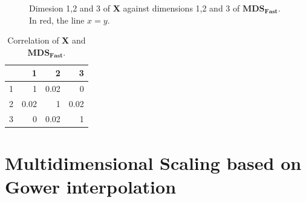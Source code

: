 \documentclass[11pt]{report}
\begin{document}
\begin{figure}[ht]
    \centering
    \caption{Dimesion 1,2 and 3 of \textbf{X} against dimensions 1,2 and 3 of  $\mathbf{MDS_{Fast}}$. \newline
            In red, the line $x=y$.}%
    \label{fast_example}%
\end{figure}


\begin{table}[ht]
\centering
\begin{tabular}{rrrr}
  \hline
 & 1 & 2 & 3 \\ 
  \hline
  1 & 1 & 0.02 & 0 \\ 
  2 & 0.02 & 1 & 0.02 \\ 
  3 & 0 & 0.02 & 1 \\ 
   \hline
\end{tabular}
\caption{Correlation of \textbf{X} and $\mathbf{MDS_{Fast}}$.} 
\label{corr_fast}
\end{table}

\section{Multidimensional Scaling based on Gower interpolation}
\end{document}
